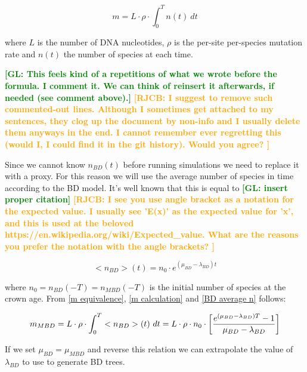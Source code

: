 \documentclass{article}
\newcommand*\richel[1]{\textcolor{orange}{\textbf{[RJCB: #1]}}}
\newcommand*\gio[1]{\textcolor{green}{\textbf{[GL: #1]}}}
\begin{document}
\begin{itemize}
\begin{equation}
m = L \cdot \rho \cdot \int_{0}^{T} n(t)\ dt \label{m calculation}
\end{equation}

where $L$ is the number of DNA nucleotides, 
$\rho$ is the per-site per-species mutation rate and
$n(t)$ the number of species at each time.

\gio{This feels kind of a repetitions of what we wrote before the formula. I comment it. We can think of reinsert it afterwards, if needed (see comment above).}
\richel{
  I suggest to remove such commented-out lines. 
  Although I sometimes get attached to my sentences,
  they clog up the document by non-info and 
  I usually delete them anyways in the end.
  I cannot remember ever regretting this (would I, 
  I could find it in the git history).
  Would you agree?
}

Since we cannot know $n_{BD}(t)$ before running simulations
we need to replace it with a proxy. 
For this reason we will use the average number of
species in time according to the BD model. 
It's well known that this is equal to \gio{insert proper citation}
\richel{
  I see you use angle bracket as a notation for the expected
  value. I usually see 'E(x)' as the expected value for 'x',
  and this is used at the beloved https://en.wikipedia.org/wiki/Expected\_value.
  What are the reasons you prefer the notation with the angle brackets?  
}

\begin{equation}
    <n_{BD}>(t) = n_{0} \cdot e^{(\mu_{BD} - \lambda_{BD})t} \label{BD average n}
\end{equation}

where $n_{0} = n_{BD}(-T) = n_{MBD}(-T)$ is the initial number of species at the crown age.
From \ref{m equivalence}, \ref{m calculation} and \ref{BD average n} follows:

\begin{equation}
m_{MBD} = L \cdot \rho \cdot \int_{0}^{T} <n_{BD}>(t)\ dt \\
= L \cdot \rho \cdot n_{0} \cdot \left[ \frac{e^{(\mu_{BD} - \lambda_{BD})T} - 1}{\mu_{BD} - \lambda_{BD}} \right]
\end{equation}

If we set $\mu_{BD} = \mu_{MBD}$ and reverse this relation we can extrapolate the value of $\lambda_{BD}$ to use to generate BD trees.


\end{itemize}
\end{document}
